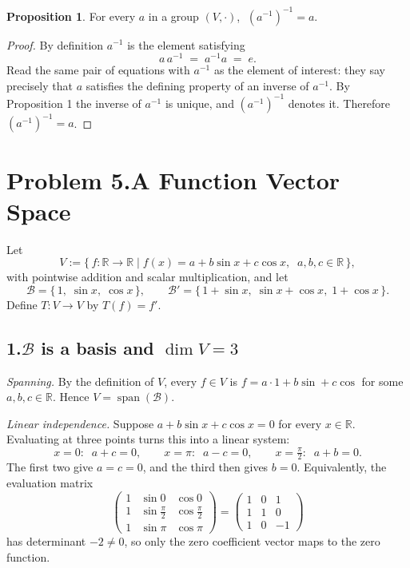 \documentclass[11pt]{article}
\DeclareMathOperator{\spn}{span}
\theoremstyle{definition}\newtheorem*{definition}{Definition}
\newtheorem{proposition}{Proposition}
\theoremstyle{definition}
\begin{document}
\begin{proposition}
For every $a$ in a group $(V,\cdot)$, $\;(a^{-1})^{-1} = a$.
\end{proposition}

\begin{proof}
By definition $a^{-1}$ is the element satisfying
\[
  a\,a^{-1} \;=\; a^{-1} a \;=\; e .
\]
Read the same pair of equations with $a^{-1}$ as the element of interest:
they say precisely that $a$ satisfies the defining property of an inverse
of $a^{-1}$. By Proposition 1 the inverse of $a^{-1}$ is unique, and
$(a^{-1})^{-1}$ denotes it. Therefore $(a^{-1})^{-1} = a$.
\end{proof}

\newpage
\section*{Problem 5.\quad A Function Vector Space \quad[30 pts]}

Let
\[
  V := \big\{\, f : \mathbb{R} \to \mathbb{R}
    \;\big|\; f(x) = a + b \sin x + c \cos x,\;\;
    a,b,c \in \mathbb{R} \,\big\},
\]
with pointwise addition and scalar multiplication, and let
\[
  \mathcal{B} = \{\, 1,\; \sin x,\; \cos x \,\},
  \qquad
  \mathcal{B}' = \{\, 1 + \sin x,\; \sin x + \cos x,\; 1 + \cos x \,\} .
\]
Define $T : V \to V$ by $T(f) = f'$.

\subsection*{1.\quad $\mathcal{B}$ is a basis and $\dim V = 3$}

\emph{Spanning.} By the definition of $V$, every $f \in V$ is
$f = a\cdot 1 + b \sin + c \cos$ for some $a,b,c \in \mathbb{R}$. Hence
$V = \spn(\mathcal{B})$.

\emph{Linear independence.} Suppose
$a + b \sin x + c \cos x = 0$ for every $x \in \mathbb{R}$. Evaluating at
three points turns this into a linear system:
\[
  x = 0:\;\; a + c = 0, \qquad
  x = \pi:\;\; a - c = 0, \qquad
  x = \tfrac{\pi}{2}:\;\; a + b = 0 .
\]
The first two give $a = c = 0$, and the third then gives $b = 0$.
Equivalently, the evaluation matrix
\[
  \begin{pmatrix}
    1 & \sin 0 & \cos 0 \\
    1 & \sin \tfrac{\pi}{2} & \cos \tfrac{\pi}{2} \\
    1 & \sin \pi & \cos \pi
  \end{pmatrix}
  =
  \begin{pmatrix}
    1 & 0 & 1 \\ 1 & 1 & 0 \\ 1 & 0 & -1
  \end{pmatrix}
\]
has determinant $-2 \ne 0$, so only the zero coefficient vector maps to
the zero function.
\end{document}
